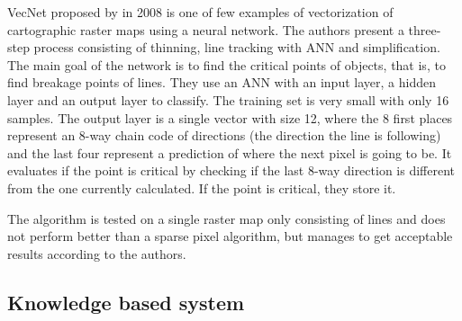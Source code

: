 VecNet proposed by \citeauthor{Karabork2008} in 2008 is one of few examples of vectorization of cartographic raster maps using a neural network. The authors present a three-step process consisting of thinning, line tracking with ANN and simplification. The main goal of the network is to find the critical points of objects, that is, to find breakage points of lines. They use an ANN with an input layer, a hidden layer and an output layer to classify. The training set is very small with only 16 samples. The output layer is a single vector with size 12, where the 8 first places represent an 8-way chain code of directions (the direction the line is following) and the last four represent a prediction of where the next pixel is going to be. It evaluates if the point is critical by checking if the last 8-way direction is different from the one currently calculated. If the point is critical, they store it.

The algorithm is tested on a single raster map only consisting of lines and does not perform better than a sparse pixel algorithm, but manages to get acceptable results according to the authors.

\subsection{Knowledge based system}
\cite{Lee2000}

\cite{Song2000}


